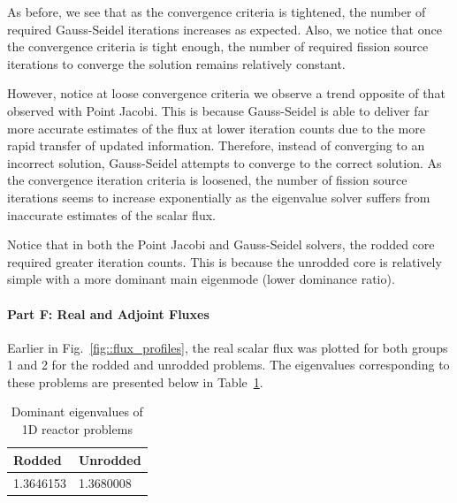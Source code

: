 \documentclass[12pt]{report}
\begin{document}
	As before, we see that as the convergence criteria is tightened, the number of required Gauss-Seidel iterations increases as expected. Also, we notice that once the convergence criteria is tight enough, the number of required fission source iterations to converge the solution remains relatively constant. 
	
	However, notice at loose convergence criteria we observe a trend opposite of that observed with Point Jacobi. This is because Gauss-Seidel is able to deliver far more accurate estimates of the flux at lower iteration counts due to the more rapid transfer of updated information. Therefore, instead of converging to an incorrect solution, Gauss-Seidel attempts to converge to the correct solution. As the convergence iteration criteria is loosened, the number of fission source iterations seems to increase exponentially as the eigenvalue solver suffers from inaccurate estimates of the scalar flux.
	
	Notice that in both the Point Jacobi and Gauss-Seidel solvers, the rodded core required greater iteration counts. This is because the unrodded core is relatively simple with a more dominant main eigenmode (lower dominance ratio).
	
	\paragraph{Part F: Real and Adjoint Fluxes}
	Earlier in Fig.~\ref{fig::flux_profiles}, the real scalar flux was plotted for both groups 1 and 2 for the rodded and unrodded problems. The eigenvalues corresponding to these problems are presented below in Table~\ref{tab::eigenvalues}.

	\begin{table}[ht]
		\begin{center}
			\caption{\label{tab::eigenvalues} Dominant eigenvalues of 1D reactor problems}
			\begin{tabular}{ll}
				\hline
				Rodded & Unrodded \\
				\hline
				1.3646153 & 1.3680008 \\
				\hline
			\end{tabular}
		\end{center}
	\end{table}
	
\end{document}
